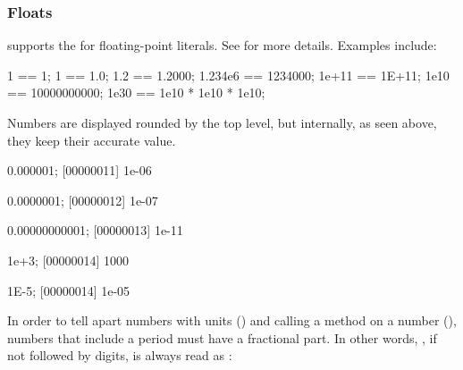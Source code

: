 \subsubsection{Floats}
\label{sec:lang:float}

\us supports the  for floating-point
literals.  See  for more details.  Examples include:


\begin{urbiassert}
            1 == 1;
            1 == 1.0;
          1.2 == 1.2000;
      1.234e6 == 1234000;
        1e+11 == 1E+11;
         1e10 == 10000000000;
         1e30 == 1e10 * 1e10 * 1e10;
\end{urbiassert}

Numbers are displayed rounded by the top level, but internally, as
seen above, they keep their accurate value.

\begin{urbiscript}
0.000001;
[00000011] 1e-06

0.0000001;
[00000012] 1e-07

0.00000000001;
[00000013] 1e-11

1e+3;
[00000014] 1000

1E-5;
[00000014] 1e-05
\end{urbiscript}

In order to tell apart numbers with units () and calling a method
on a number (), numbers that include a period must have a
fractional part.  In other words, , if not followed by digits, is
always read as :

